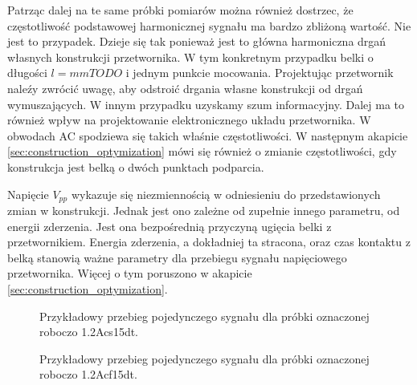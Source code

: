 \ident Patrząc dalej na te same próbki pomiarów można również dostrzec, że częstotliwość podstawowej harmonicznej sygnału ma bardzo zbliżoną wartość. Nie jest to przypadek. Dzieje się tak ponieważ jest to główna harmoniczna drgań własnych konstrukcji przetwornika. W tym konkretnym przypadku belki o długości $l = mmTODO$ i jednym punkcie mocowania. Projektując przetwornik naleźy zwrócić uwagę, aby odstroić drgania własne konstrukcji od drgań wymuszających. W innym przypadku uzyskamy szum informacyjny. Dalej ma to również wpływ na projektowanie elektronicznego układu przetwornika. W obwodach AC spodziewa się takich właśnie częstotliwości. W następnym akapicie \ref{sec:construction_optymization} mówi się również o zmianie częstotliwości, gdy konstrukcja jest belką o dwóch punktach podparcia.

\ident Napięcie $V_{pp}$ wykazuje się niezmiennością w odniesieniu do przedstawionych zmian w konstrukcji. Jednak jest ono zależne od zupełnie innego parametru, od energii zderzenia. Jest ona bezpośrednią przyczyną ugięcia belki z przetwornikiem. Energia zderzenia, a dokładniej ta stracona, oraz czas kontaktu z belką stanowią ważne parametry dla przebiegu sygnału napięciowego przetwornika. Więcej o tym poruszono w akapicie \ref{sec:construction_optymization}.

\begin{figure}[htbp]
\centering
{}%
\caption{Przykładowy przebieg pojedynczego sygnału dla próbki oznaczonej roboczo 1.2Acs15dt.}
\label{fig:scope_without_silencer}
\end{figure}

\begin{figure}[htbp]
\centering
{}%
\caption{Przykładowy przebieg pojedynczego sygnału dla próbki oznaczonej roboczo 1.2Acf15dt.}
\label{fig:scope_with_silencer}
\end{figure}
